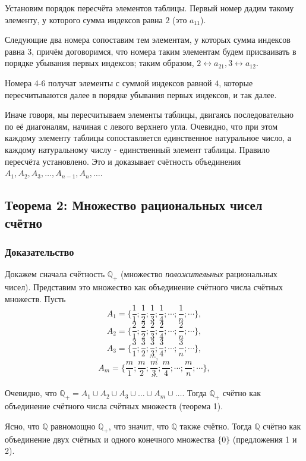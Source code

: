 \documentclass{article}
\begin{document}
Установим порядок пересчёта элементов таблицы. Первый номер дадим такому элементу, у которого сумма индексов равна $2$ (это $a_{11}$). 

Следующие два номера сопоставим тем элементам, у которых сумма индексов равна $3$, причём договоримся, что номера таким элементам будем присваивать в порядке убывания первых индексов; таким образом, $2 \leftrightarrow a_{21}, 3 \leftrightarrow a_{12}$. 

Номера 4-6 получат элементы с суммой индексов равной $4$, которые пересчитываются далее в порядке убывания первых индексов, и так далее.

Иначе говоря, мы пересчитываем элементы таблицы, двигаясь последовательно по её диагоналям, начиная с левого верхнего угла. Очевидно, что при этом каждому элементу таблицы сопоставляется единственное натуральное число, а каждому натуральному числу - единственный элемент таблицы. Правило пересчёта установлено. Это и доказывает счётность объединения $A_1, A_2, A_3, \dots, A_{n-1}, A_n, \dots$.

\subsection{Теорема 2: Множество рациональных чисел счётно}
\subsubsection*{Доказательство}

Докажем сначала счётность $\mathbb{Q}_+$ (множество \textit{положительных} рациональных чисел). Представим это множество как объединение счётного числа счётных множеств. Пусть \[
	A_1 = \{\frac{1}{1}; \frac{1}{2}; \frac{1}{3}; \frac{1}{4}; \cdots; \frac{1}{n}; \cdots\}, \]\[
	A_2 = \{\frac{2}{1}; \frac{2}{2}; \frac{2}{3}; \frac{2}{4}; \cdots; \frac{2}{n}; \cdots\}, \]\[
	A_3 = \{\frac{3}{1}; \frac{3}{2}; \frac{3}{3}; \frac{3}{4}; \cdots; \frac{3}{n}; \cdots\}, \]\[
	\cdots, \]\[
	A_m = \{\frac{m}{1}; \frac{m}{2}; \frac{m}{3}; \frac{m}{4}; \cdots; \frac{m}{n}; \cdots\}, \]\[
	\cdots
\]

Очевидно, что $\mathbb{Q}_+ = A_1 \cup A_2 \cup A_3 \cup \dots \cup A_m \cup \dots$. Тогда $\mathbb{Q}_+$ счётно как объединение счётного числа счётных множеств (теорема 1).

Ясно, что $\mathbb{Q}$ равномощно $\mathbb{Q}_+$, что значит, что $\mathbb{Q}$ также счётно. Тогда $\mathbb{Q}$ счётно как объединение двух счётных и одного конечного множества $\{0\}$ (предложения 1 и 2).
\end{document}
